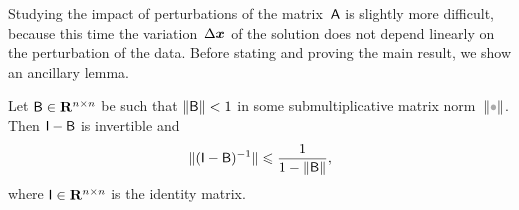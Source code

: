 Studying the impact of perturbations of the matrix~$\mathsf A$ is slightly more difficult,
because this time the variation~$\Delta \mathbf{\boldsymbol{x}}$ of the solution does not depend linearly on the perturbation of the data.
Before stating and proving the main result,
we show an ancillary lemma.
\begin{lemma}
    \label{lemma:linear_inverse_neumann}
    Let $\mathsf B \in \mathbf R^{n \times n}$ be such that $\lVert\mathsf B\rVert < 1$ in some submultiplicative matrix norm~$\norm{\placeholder}$.
    Then $\mathsf I - \mathsf B$ is invertible and
    \begin{equation}
        \label{eq:linear_bound_inverse_perturbation_identity}
        \lVert(\mathsf I - \mathsf B)^{-1}\rVert
        \leqslant \frac{1}{1 - \lVert\mathsf B\rVert},
    \end{equation}
    where $\mathsf I \in \mathbf R^{n \times n}$ is the identity matrix.
\end{lemma}

